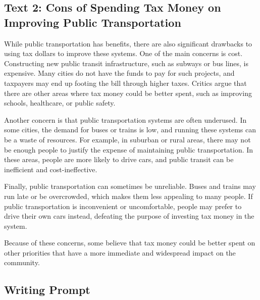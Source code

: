 \documentclass[12pt]{article}
\begin{document}
\vspace{1cm}

\subsection*{Text 2: Cons of Spending Tax Money on Improving Public Transportation}

\begin{tcolorbox}[colframe=black!40, colback=gray!5]
\begin{spacing}{1.15}
    While public transportation has benefits, there are also significant drawbacks to using tax dollars to improve these systems. One of the main concerns is cost. Constructing new public transit infrastructure, such as subways or bus lines, is expensive. Many cities do not have the funds to pay for such projects, and taxpayers may end up footing the bill through higher taxes. Critics argue that there are other areas where tax money could be better spent, such as improving schools, healthcare, or public safety.

    Another concern is that public transportation systems are often underused. In some cities, the demand for buses or trains is low, and running these systems can be a waste of resources. For example, in suburban or rural areas, there may not be enough people to justify the expense of maintaining public transportation. In these areas, people are more likely to drive cars, and public transit can be inefficient and cost-ineffective.

    Finally, public transportation can sometimes be unreliable. Buses and trains may run late or be overcrowded, which makes them less appealing to many people. If public transportation is inconvenient or uncomfortable, people may prefer to drive their own cars instead, defeating the purpose of investing tax money in the system.

    Because of these concerns, some believe that tax money could be better spent on other priorities that have a more immediate and widespread impact on the community.
\end{spacing}
\end{tcolorbox}

\vspace{1cm}

\subsection*{Writing Prompt}
\end{document}
